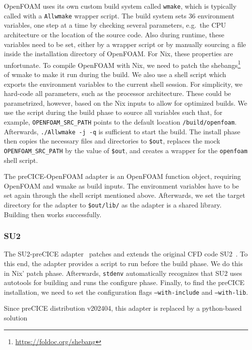 \documentclass{eceasst}
\begin{document}
OpenFOAM uses its own custom build system called \texttt{wmake}, which is typically called with a \texttt{Allwmake} wrapper script.
The build system sets 36 environment variables, one step at a time by checking several parameters, e.g.~the CPU architecture or the location of the source code. Also during runtime, these variables need to be set, either by a wrapper script or by manually sourcing a file inside the installation directory of OpenFOAM.
For Nix, these properties are unfortunate. To compile OpenFOAM with Nix, we need to patch the shebangs\footnote{\url{https://foldoc.org/shebang}} of wmake to make it run during the build.
We also use a shell script which exports the environment variables to the current shell session.
For simplicity, we hard-code all parameters, such as the processor architecture. These could be parametrized, however, based on the Nix inputs to allow for optimized builds. We use the script during the build phase to source all variables such that, for example, \texttt{OPENFOAM\_SRC\_PATH} points to the default location \texttt{/build/openfoam}.
Afterwards, \texttt{./Allwmake -j -q} is sufficient to start the build.
The install phase then copies the necessary files and directories to \texttt{\$out}, replaces the mock \texttt{OPENFOAM\_SRC\_PATH} by the value of \texttt{\$out}, and creates a wrapper for the \texttt{openfoam} shell script.

The preCICE-OpenFOAM adapter is an OpenFOAM function object, requiring OpenFOAM and wmake as build inputs.
The environment variables have to be set again through the shell script mentioned above.
Afterwards, we set the target directory for the adapter to \texttt{\$out/lib/} as the adapter is a shared library. Building then works successfully.

\subsubsection{SU2}

The SU2-preCICE adapter~\cite{Uekermann2017_Adapters} patches and extends the original CFD code SU2~\cite{su2}.
To this end, the adapter provides a script to run before the build phase.
We do this in Nix' patch phase. Afterwards, \texttt{stdenv} automatically recognizes that SU2 uses autotools for building and runs the configure phase.
Finally, to find the preCICE installation, we need to set the configuration flags \texttt{--with-include} and \texttt{--with-lib}.

Since preCICE distribution v202404, this adapter is replaced by a python-based solution
\end{document}
